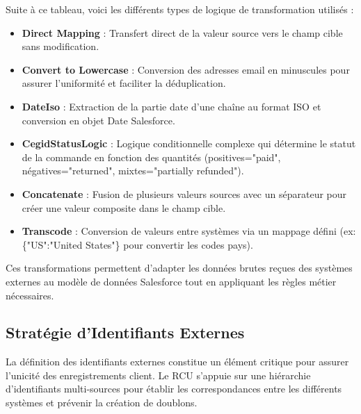 \noindent Suite à ce tableau, voici les différents types de logique de transformation utilisés :

\begin{itemize}
  \item \textbf{Direct Mapping} : Transfert direct de la valeur source vers le champ cible sans modification.
  \item \textbf{Convert to Lowercase} : Conversion des adresses email en minuscules pour assurer l'uniformité et faciliter la déduplication.
  \item \textbf{DateIso} : Extraction de la partie date d'une chaîne au format ISO et conversion en objet Date Salesforce.
  \item \textbf{CegidStatusLogic} : Logique conditionnelle complexe qui détermine le statut de la commande en fonction des quantités (positives="paid", négatives="returned", mixtes="partially refunded").
  \item \textbf{Concatenate} : Fusion de plusieurs valeurs sources avec un séparateur pour créer une valeur composite dans le champ cible.
  \item \textbf{Transcode} : Conversion de valeurs entre systèmes via un mappage défini (ex: \{"US":"United States"\} pour convertir les codes pays).
\end{itemize}

Ces transformations permettent d'adapter les données brutes reçues des systèmes externes au modèle de données Salesforce tout en appliquant les règles métier nécessaires.

\subsection{Stratégie d'Identifiants Externes}


\begin{mdframed}[style=breakablegreen]
La définition des identifiants externes constitue un élément critique pour assurer l'unicité des enregistrements client. Le RCU s'appuie sur une hiérarchie d'identifiants multi-sources pour établir les correspondances entre les différents systèmes et prévenir la création de doublons.
\end{mdframed}

